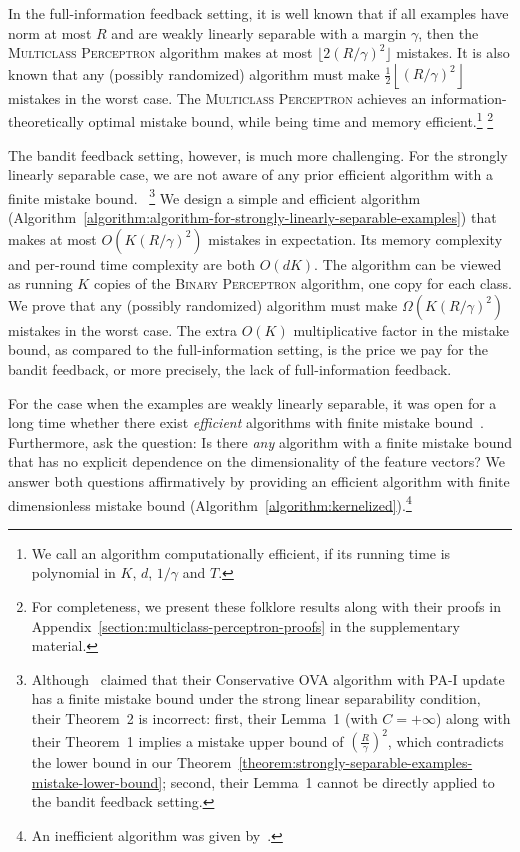 In the full-information feedback setting, it is well known
\citep{Crammer-Singer-2003} that if all examples have norm at most $R$ and are
weakly linearly separable with a margin $\gamma$, then the \textsc{Multiclass
Perceptron} algorithm makes at most $\lfloor 2(R/\gamma)^2 \rfloor$ mistakes. It
is also known that any (possibly randomized) algorithm must make $\frac{1}{2}
\left\lfloor (R/\gamma)^2 \right \rfloor$ mistakes in the worst case. The
\textsc{Multiclass Perceptron} achieves an information-theoretically optimal
mistake bound, while being time and memory efficient.\footnote{We call an algorithm
 computationally efficient, if its running time is polynomial in $K$, $d$, $1/\gamma$
 and $T$.}
\footnote{For
completeness, we present these folklore results along with their proofs in
Appendix~\ref{section:multiclass-perceptron-proofs} in the supplementary
material.}

The bandit feedback setting, however, is much more challenging. For the
strongly linearly separable case, we are not aware of any
prior efficient algorithm with a finite mistake bound.
~\footnote{Although~\citet{Chen-Chen-Zhang-Chen-Zhang-2009}
claimed that their Conservative OVA algorithm with PA-I update has a finite
mistake bound under the strong linear separability condition, their
Theorem~2 is incorrect: first, their Lemma~1 (with $C = +\infty$) along with their Theorem~1
implies a mistake upper bound of
$(\frac{R}{\gamma})^2$, which contradicts the lower
bound in our Theorem~\ref{theorem:strongly-separable-examples-mistake-lower-bound};
second, their Lemma~1 cannot be directly applied to the bandit feedback setting.}
We design a simple and
efficient algorithm
(Algorithm~\ref{algorithm:algorithm-for-strongly-linearly-separable-examples})
that makes at most $O(K (R/\gamma)^2)$ mistakes in expectation. Its memory
complexity and per-round time complexity are both $O(dK)$. The algorithm can be
viewed as running $K$ copies of the \textsc{Binary Perceptron} algorithm, one
copy for each class. We prove that any (possibly randomized) algorithm must make
$\Omega(K (R/\gamma)^2)$ mistakes in the worst case. The extra $O(K)$
multiplicative factor in the mistake bound, as compared to the full-information
setting, is the price we pay for the bandit feedback, or more precisely, the
lack of full-information feedback.

For the case when the examples are weakly linearly separable, it was open for a
long time whether there exist \textit{efficient} algorithms with finite mistake
bound~\citep{Kakade-Shalev-Shwartz-Tewari-2008, Beygelzimer-Orabona-Zhang-2017}.
Furthermore, \citet{Kakade-Shalev-Shwartz-Tewari-2008} ask the question:
Is there \textit{any} algorithm with a finite mistake bound that has no explicit
dependence on the dimensionality of the feature vectors? We answer both
questions affirmatively by providing an efficient algorithm with finite
dimensionless mistake bound (Algorithm~\ref{algorithm:kernelized}).\footnote{An
inefficient algorithm was given by~\cite{Daniely-Helbertal-2013}.}

